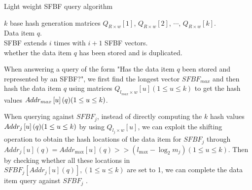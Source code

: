 \documentclass[10pt,journal,compsoc]{IEEEtran}
\begin{document}
\begin{algorithm}[h]
\caption{Light weight SFBF query algorithm}
\label{alg:Low cost query algorithm}
\begin{algorithmic}[1]
\REQUIRE
$k$ base hash generation matrices ${Q_{R \times w}}[1]$, ${Q_{R \times w}}[2]$, $\cdots$, ${Q_{R \times w}}[k]$. \\
Data item $q$.\\
SFBF extends $i$ times with $i+1$ SFBF vectors.\\
\ENSURE
whether the data item $q$ has been stored and is duplicated.\\
\ENDFOR
\end{algorithmic}
\end{algorithm}

When answering a query of the form "Has the data item $q$ been stored and represented by an SFBF?", we first find the longest vector $SFBF_{max}$ and then hash the data item $q$ using matrices  ${Q_{l_{max} \times w}}\left[ u \right] \left( {1 \le u \le k} \right)$ to get the hash values $Add{r_{max}}\left[ u \right](q){\rm{ }}({\rm{1}} \le u \le k)$.

When querying against $SFBF_j$, instead of directly computing the $k$ hash values $Add{r_j}\left[ u \right](q){\rm{ }}({\rm{1}} \le u \le k)$ by using ${Q_{l_j \times w}}\left[ u \right]$, we can exploit the shifting operation to obtain the hash locations of the data item for $SFBF_j$ through $Add{r_j}\left[ u \right](q) = Add{r_{\max }}\left[ u \right] (q)>  > \left( {{l_{\max }} - {{\log }_2}{m_j}} \right)\left( {1 \le u \le k} \right)$.
Then by checking whether all these locations in $SFB{F_j}\left[ {Add{r_j}\left[ u \right](q)} \right],\left( {1 \le u \le k} \right)$ are set to 1, we can complete the data item query against $SFBF_j$ .
\end{document}
